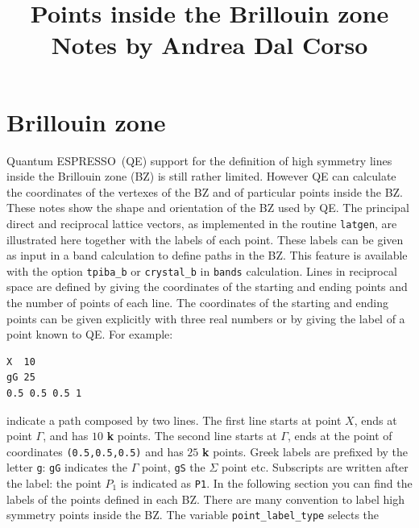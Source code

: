 \documentclass[12pt,a4paper]{article}
\def\qe{{\sc Quantum ESPRESSO}}
\def\qeImage{../../Doc/quantum_espresso.pdf}
\def\democritosImage{../../Doc/democritos.pdf}
\begin{document}
 
\author{}
\date{}
\title{
  \vskip 1cm
  \Huge Points inside the Brillouin zone \\
  \Large Notes by Andrea Dal Corso
}
\maketitle

\newpage

\section{Brillouin zone}

\qe\ (QE) support for the definition of high symmetry lines inside the Brillouin
zone (BZ) is still rather limited. However QE can calculate the coordinates 
of the vertexes of the BZ and of particular points inside the BZ. These 
notes show the shape and orientation of the BZ used by QE. The principal 
direct and reciprocal lattice vectors, as implemented 
in the routine \texttt{latgen}, are illustrated here together with the labels 
of each point. These labels can be given as input in a band calculation
to define paths in the BZ. This feature is available with the option 
\texttt{tpiba\_b} or \texttt{crystal\_b} in \texttt{bands} calculation. 
Lines in reciprocal space are defined by giving the coordinates of the 
starting and ending points and the number of points of each line.
The coordinates of the starting and ending points can be 
given explicitly with three real numbers or by giving the label of a 
point known to QE.
For example:
\begin{verbatim}
X  10
gG 25
0.5 0.5 0.5 1
\end{verbatim}
indicate a path composed by two lines. The first line starts at point $X$,
ends at point $\Gamma$, and has $10$ {\bf k} points. The second line starts
at $\Gamma$, ends at the point of coordinates \texttt{(0.5,0.5,0.5)} and
has $25$ {\bf k} points. Greek labels are prefixed by the letter
\texttt{g}: \texttt{gG} indicates the $\Gamma$ point, \texttt{gS} the 
$\Sigma$ point etc. Subscripts are written after the label: the point $P_1$ 
is indicated as \texttt{P1}. In the following section you can find the
labels of the points defined in each BZ. 
There are many convention to label high symmetry
points inside the BZ. The variable \texttt{point\_label\_type} selects the
\end{document}
